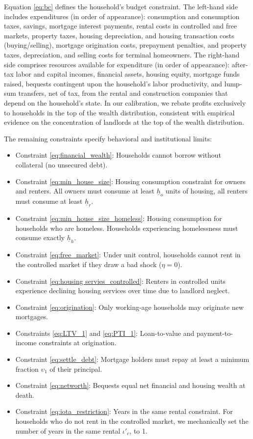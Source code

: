 \documentclass[parskip=full]{article}
\begin{document}
Equation \eqref{eq:bc} defines the household's budget constraint. The left-hand side includes expenditures (in order of appearance): consumption and consumption taxes, savings, mortgage interest payments, rental costs in controlled and free markets, property taxes, housing depreciation, and housing transaction costs (buying/selling), mortgage origination costs, prepayment penalties, and property taxes, depreciation, and selling costs for terminal homeowners. The right-hand side comprises resources available for expenditure (in order of appearance): after-tax labor and capital incomes, financial assets, housing equity, mortgage funds raised, bequests contingent upon the household's labor productivity, and lump-sum transfers, net of tax, from the rental and construction companies that depend on the household's state. In our calibration, we rebate profits exclusively to households in the top of the wealth distribution, consistent with empirical evidence on the concentration of landlords at the top of the wealth distribution.

The remaining constraints specify behavioral and institutional limits: 
\begin{itemize}
    \item Constraint \eqref{eq:financial_wealth}: Households cannot borrow without collateral (no unsecured debt).
    \item Constraint \eqref{eq:min_house_size}: Housing consumption constraint for owners and renters. All owners must consume at least $\underline{h}_{o}$ units of housing, all renters must consume at least $\underline{h}_{r}$.
    \item Constraint \eqref{eq:min_house_size_homeless}: Housing consumption for households who are homeless. Households experiencing homelessness must consume exactly $\underline{h}_{h}$.
    \item Constraint \eqref{eq:free_market}: Under unit control, households cannot rent in the controlled market if they draw a bad shock ($\eta=0$).
    \item Constraint \eqref{eq:housing servies_controlled}: Renters in controlled units experience declining housing services over time due to landlord neglect. 
    \item Constraint \eqref{eq:origination}: Only working-age households may originate new mortgages.
    \item Constraints \eqref{eq:LTV_1} and \eqref{eq:PTI_1}: Loan-to-value and payment-to-income constraints at origination.
    \item Constraint \eqref{eq:settle_debt}: Mortgage holders must repay at least a minimum fraction $\upsilon_{1}$ of their principal.
    \item Constraint \eqref{eq:networth}: Bequests equal net financial and housing wealth at death.
    \item Constraint \eqref{eq:iota_restriction}: Years in the same rental constraint. For households who do not rent in the controlled market, we mechanically set the number of years in the same rental $\iota'_{c}$, to 1.
\end{itemize} 
\end{document}
